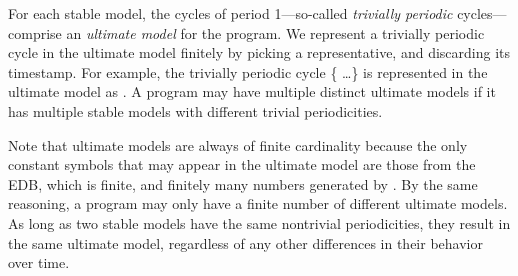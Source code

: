 \begin{definition}
For each stable model, the cycles  of period 1---so-called {\em trivially periodic} cycles---comprise an {\em ultimate model} for the program.  We represent a trivially periodic cycle in the ultimate model finitely by picking a representative, and discarding its timestamp.  For example, the trivially periodic cycle \{ \ldots\} is represented in the ultimate model as .  A program may have multiple distinct ultimate models if it has multiple stable models with different trivial periodicities.
\end{definition}

Note that ultimate models are always of finite cardinality because the only constant symbols that may appear in the ultimate model are those from the EDB, which is finite, and finitely many numbers generated by .  By the same reasoning, a \lang program may only have a finite number of different ultimate models.  As long as two stable models have the same nontrivial periodicities, they result in the same ultimate model, regardless of any other differences in their behavior over time.

%


